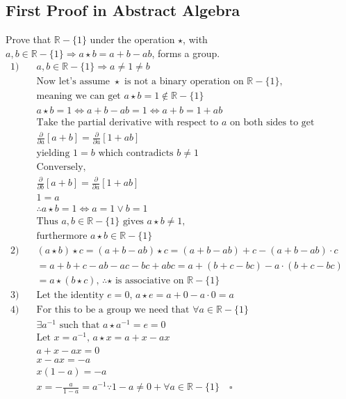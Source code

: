 \documentclass{article}
\begin{document}
\subsection*{First Proof in Abstract Algebra}
Prove that \( \mathbb{R} - \{1\} \) under the operation \(\star\), 
with \(a,b \in \mathbb{R} - \{1\} \Rightarrow a \star b = a+b-ab\),
forms a group.
\begin{align*} 
  1) \quad & a,b \in \mathbb{R} - \{1\} \Rightarrow a \neq 1 \neq b & \\
           & \text{Now let's assume } \star \text{ is not a binary operation on } \mathbb{R} - \{1\} \text{,}   & \\
           & \text{meaning we can get } a \star b = 1 \notin \mathbb{R} - \{1\} & \\
     & a \star b = 1 \Leftrightarrow a+b-ab = 1 \Leftrightarrow a+b = 1 + ab&\\
     & \text{Take the partial derivative with respect to } a \text{ on both sides to get} &\\
     & \frac{\partial}{\partial{a}} [a+b] = \frac{\partial}{\partial{a}} [1 + ab]  & \\
     & \text{yielding } 1 = b \text{ which contradicts } b \neq 1 & \\
     & \text{Conversely, } & \\
     & \frac{\partial}{\partial{b}} [a+b] = \frac{\partial}{\partial{a}}[1+ab] & \\
     & 1 = a & \\
     & \therefore a \star b = 1 \Leftrightarrow a = 1 \lor b = 1 & \\
     & \text{Thus } a,b \in \mathbb{R} - \{1\} \text{ gives } a \star b \neq 1 \text{,} &\\
     & \text{furthermore } a \star b \in \mathbb{R} - \{1\}& \\
  2) \quad  & (a \star b) \star c = (a+b - ab) \star c = (a+b-ab) + c - (a+b-ab) \cdot c & \\
     & = a + b + c - ab - ac - bc + abc = a + (b + c - bc) - a \cdot (b + c -bc) & \\
     & = a \star (b \star c) \text{, } \therefore \star \text{ is associative on } \mathbb{R} - \{1\} & \\
  3) \quad & \text{Let the identity } e = 0 \text{, } a \star e = a+0 - a \cdot 0 = a & \\
  4) \quad & \text{For this to be a group we need that } \forall a \in \mathbb{R} - \{1\} & \\
           & \exists a^{-1} \text{ such that } a \star a^{-1} = e = 0 & \\
           & \text{Let } x = a^{-1} \text{, } a \star x = a+x-ax & \\
           & a+x-ax = 0 & \\
           & x - ax = -a & \\
           & x (1-a) = -a & \\
           & x = - \frac{a}{1-a} = a^{-1} \because 1-a \neq 0 +\forall a \in \mathbb{R} - \{1\} \quad \square & \\
\end{align*}
\end{document}
